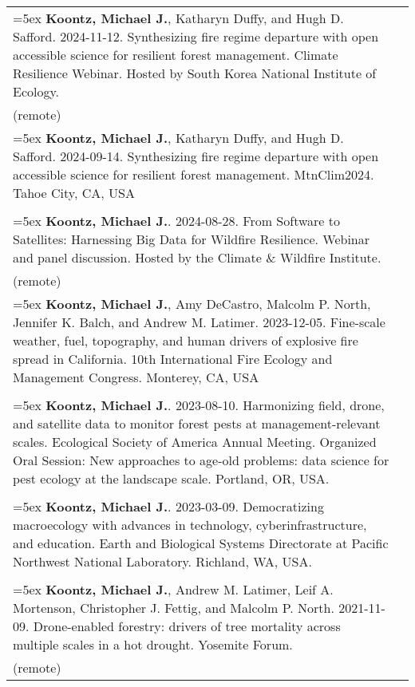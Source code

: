\begin{longtable}{@{}>{\raggedright}p{5.25in} @{} >{\raggedleft}X@{}}

\hangindent=5ex \textbf{Koontz, Michael J.}, Katharyn Duffy, and Hugh D. Safford. 2024-11-12. Synthesizing fire regime departure with open accessible science for resilient forest management. Climate Resilience Webinar. Hosted by South Korea National Institute of Ecology. & 2024 \\ (remote) \tabularnewline

\hangindent=5ex \textbf{Koontz, Michael J.}, Katharyn Duffy, and Hugh D. Safford. 2024-09-14. Synthesizing fire regime departure with open accessible science for resilient forest management. MtnClim2024. Tahoe City, CA, USA & 2024 \\ \tabularnewline

\hangindent=5ex \textbf{Koontz, Michael J.}. 2024-08-28. From Software to Satellites: Harnessing Big Data for Wildfire Resilience. Webinar and panel discussion. Hosted by the Climate \& Wildfire Institute. & 2024 \\ (remote)  \tabularnewline

\hangindent=5ex \textbf{Koontz, Michael J.}, Amy DeCastro, Malcolm P. North, Jennifer K. Balch, and Andrew M. Latimer. 2023-12-05. Fine-scale weather, fuel, topography, and human drivers of explosive fire spread in California. 10th International Fire Ecology and Management Congress. Monterey, CA, USA & 2023 \\ \tabularnewline

\hangindent=5ex \textbf{Koontz, Michael J.}. 2023-08-10. Harmonizing field, drone, and satellite data to monitor forest pests at management-relevant scales. Ecological Society of America Annual Meeting. Organized Oral Session: New approaches to age-old problems: data science for pest ecology at the landscape scale. Portland, OR, USA. & 2023 \\  \tabularnewline

\hangindent=5ex \textbf{Koontz, Michael J.}. 2023-03-09. Democratizing macroecology with advances in technology, cyberinfrastructure, and education. Earth and Biological Systems Directorate at Pacific Northwest National Laboratory. Richland, WA, USA. & 2023 \\  \tabularnewline

\hangindent=5ex \textbf{Koontz, Michael J.}, Andrew M. Latimer, Leif A. Mortenson, Christopher J. Fettig, and Malcolm P. North. 2021-11-09. Drone-enabled forestry: drivers of tree mortality across multiple scales in a hot drought. Yosemite Forum. & 2021 \\ (remote) \tabularnewline


\end{longtable}
